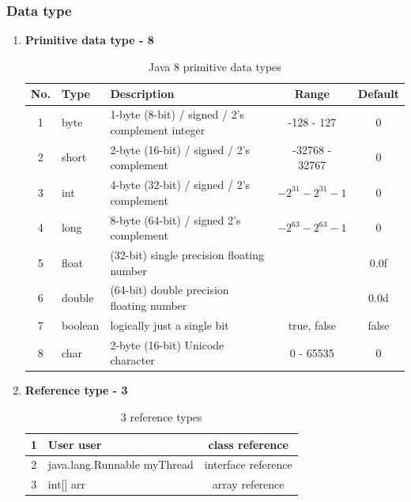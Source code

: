 \documentclass[12pt, a4paper]{report}
\begin{document}
    \subsubsection{Data type}
        \begin{enumerate}
            \item \textbf{Primitive data type - 8}
            \begin{table}[H]
        	\centering
	        \begin{tabular}{c|l|l|c|c}
	        \toprule
	        No. & Type & Description & Range & Default \\
	        \toprule
	        1 & byte & 1-byte (8-bit) / signed / 2's complement integer & -128 - 127 & 0 \\
            \hline
	        2 & short & 2-byte (16-bit) / signed / 2's complement & -32768 - 32767 & 0 \\
	        \hline
	        3 & int & 4-byte (32-bit) / signed / 2's complement & $-2^{31} - 2^{31}-1$ & 0 \\
	        \hline
	        4 & long & 8-byte (64-bit) / signed 2's complement & $-2^{63} - 2^{63}-1$ & 0 \\
            \hline
	        5 & float & (32-bit) single precision floating number  & & 0.0f \\
	        \hline
	        6 & double & (64-bit) double precision floating number & & 0.0d \\
	        \hline
	        7 & boolean & logically just a single bit &  true, false & false \\
	        \hline
	        8 & char & 2-byte (16-bit) Unicode character & 0 - 65535  & 0 \\
	        \bottomrule
	        \end{tabular}
	        \caption{Java 8 primitive data types}
	        \end{table}
            \item \textbf{Reference type - 3}
            \begin{table}[H]
                \centering
                \begin{tabular}{c|l|c}
                     \toprule
                     1 & User user & class reference  \\
                     \hline
                     2 & java.lang.Runnable myThread & interface reference \\
                     \hline
                     3 & int[] arr & array reference \\ 
                     \bottomrule
                \end{tabular}
                \caption{3 reference types}
                \label{tab:my_label}
            \end{table}
            

\end{enumerate}
\end{document}
